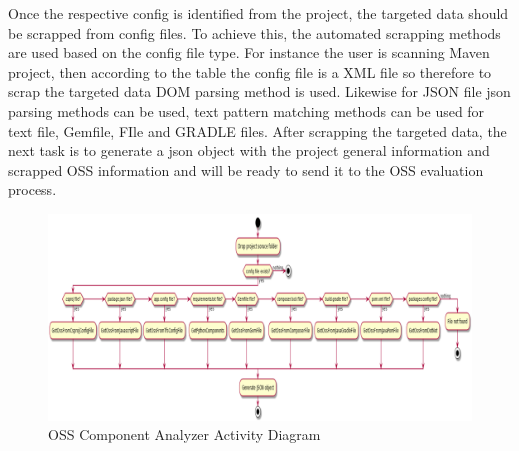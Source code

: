 Once the respective config is identified from the project, the targeted data should be scrapped from config files. To achieve this, the automated scrapping methods are used based on the config file type. For instance the user is scanning Maven project, then according to the table the config file is a XML file so therefore to scrap the targeted data DOM parsing method is used. Likewise for \acs{JSON} file json parsing methods can be used, text pattern matching methods can be used for text file, Gemfile, FIle and GRADLE files. After scrapping the targeted data, the next task is to generate a json object with the project general information and scrapped \ac{OSS} information and will be ready to send it to the \acs{OSS} evaluation process. 
\newpage
 \begin{figure}[h!]
	\includegraphics[width=15cm]{includes/OSS_Analyzer_Activity_Diagram.png}
	\centering
	\caption{\acs{OSS} Component Analyzer Activity Diagram}
	\label{fig:Analyzer_Activity_Diagram}
\end{figure}
